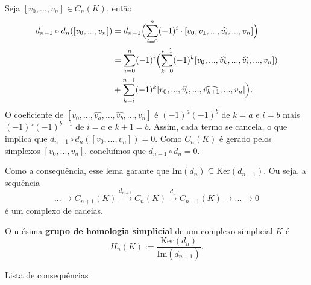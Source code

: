 \begin{dem}
    Seja $[v_0,...,v_n]\in C_n(K)$, então 
    \begin{align*}
        d_{n-1}\circ d_n ( [v_0,...,v_n])&=d_{n-1}\Bigl(\sum_{i=0}^n (-1)^i \cdot[v_0,v_1,...,\widehat{v_i},...,v_n] \Bigr) \\
        &=\sum_{i=0}^n (-1)^i  \Bigl( \sum_{k=0}^{i-1}(-1)^k[v_0,...,\widehat{v_k},...,\widehat{v_i},...,v_n])\\
        &+\sum_{k=i}^{n-1} (-1)^k[v_0,...,\widehat{v_i},...,\widehat{v_{k+1}},...,v_n]  \Bigr).
    \end{align*}
    O coeficiente de $[v_0,...,\widehat{v_a},...,\widehat{v_b},...,v_n]$ é $(-1)^a(-1)^b$ de $k=a$ e $i=b$ mais $(-1)^a(-1)^{b-1}$ de $i=a$ e $k+1=b$. Assim, cada termo se cancela, o que implica que $d_{n-1}\circ d_n([v_0,...,v_n])=0$. Como $C_n(K)$ é gerado pelos simplexos $[v_0,...,v_n]$, concluímos que $d_{n-1}\circ d_n=0$.
\end{dem}

Como a consequência, esse lema garante que $\text{Im}(d_n)\subseteq \text{Ker}(d_{n-1})$. Ou seja, a sequência 
\[...\rightarrow C_{n+1}(K)\xrightarrow{d_{n+1}}C_n(K)\xrightarrow{d_n} C_{n-1}(K)\rightarrow...\rightarrow 0\]
é um complexo de cadeias.

\begin{defi}
    O n-ésima \textbf{grupo de homologia simplicial} de um complexo simplicial $K$ é 
    \[H_n(K):=\frac{\text{Ker}(d_n)}{\text{Im}(d_{n+1})}.\]
\end{defi}


\begin{titlemize}{Lista de consequências}
	\item %
\end{titlemize}
